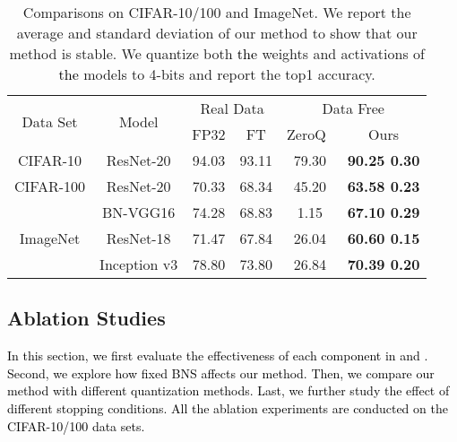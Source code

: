 \documentclass[runningheads]{llncs}
\def\lhk{\textcolor{black}}
\def\new{\textcolor{black}}
\begin{document}
\begin{table}[t]
\renewcommand\arraystretch{1.1}
\renewcommand{\tabcolsep}{5.0pt}
\begin{center}
\caption{Comparisons on CIFAR-10/100 and ImageNet. We report the average and standard deviation of our method to show that our method is stable. We quantize both \new{the} weights and activations of \new{the} models to 4-bits and report the top1 accuracy.}
\label{tb:comparison_CIFAR_ImageNet}
\begin{tabular}{c|c|cc|cc}
\hline
\multirow{2}{*}{Data Set} &\multirow{2}{*}{Model} & \multicolumn{2}{c}{Real Data} &\multicolumn{2}{|c}{Data Free }  \\ \cline{3-6}
 &  & FP32 & FT & ZeroQ~\cite{Cai_2020_CVPR} & Ours  \\ 
\hline
CIFAR-10  & ResNet-20 & 94.03 & 93.11 & 79.30 & \textbf{90.25  0.30} \\
CIFAR-100 & ResNet-20 & 70.33 & 68.34 & 45.20 & \textbf{63.58  0.23} \\
\hline
\multirow{3}{*}{ImageNet} & BN-VGG16 & 74.28 & 68.83 & 1.15 & \textbf{67.10  0.29} \\
& ResNet-18 & 71.47 & 67.84 & 26.04 & \textbf{60.60  0.15} \\
& Inception v3 & 78.80 & 73.80 & 26.84 & \textbf{70.39  0.20}\\
\hline
\end{tabular}
\end{center}
\end{table}

\subsection{Ablation Studies}
\lhk{In this section, we first evaluate the effectiveness of each component in  and  . Second, we explore how fixed BNS affects our method. Then, we compare our method with different quantization methods. Last, we further study the effect of different stopping conditions. All the ablation experiments are conducted on the CIFAR-10/100 data sets.}
\end{document}
